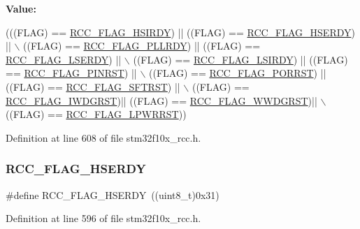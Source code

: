 {\bfseries Value\+:}
\begin{DoxyCode}
(((FLAG) == \hyperlink{group___r_c_c___flag_ga827d986723e7ce652fa733bb8184d216}{RCC\_FLAG\_HSIRDY}) || ((FLAG) == \hyperlink{group___r_c_c___flag_ga173edf47bec93cf269a0e8d0fec9997c}{RCC\_FLAG\_HSERDY}) || \(\backslash\)
                            ((FLAG) == \hyperlink{group___r_c_c___flag_gaf82d8afb18d9df75db1d6c08b9c50046}{RCC\_FLAG\_PLLRDY}) || ((FLAG) == 
      \hyperlink{group___r_c_c___flag_gac9fb963db446c16e46a18908f7fe1927}{RCC\_FLAG\_LSERDY}) || \(\backslash\)
                            ((FLAG) == \hyperlink{group___r_c_c___flag_ga8c5e4992314d347597621bfe7ab10d72}{RCC\_FLAG\_LSIRDY}) || ((FLAG) == 
      \hyperlink{group___r_c_c___flag_gabfc3ab5d4a8a94ec1c9f38794ce37ad6}{RCC\_FLAG\_PINRST}) || \(\backslash\)
                            ((FLAG) == \hyperlink{group___r_c_c___flag_ga39ad309070f416720207eece5da7dc2c}{RCC\_FLAG\_PORRST}) || ((FLAG) == 
      \hyperlink{group___r_c_c___flag_gaf7852615e9b19f0b2dbc8d08c7594b52}{RCC\_FLAG\_SFTRST}) || \(\backslash\)
                            ((FLAG) == \hyperlink{group___r_c_c___flag_gaac46bac8a97cf16635ff7ffc1e6c657f}{RCC\_FLAG\_IWDGRST})|| ((FLAG) == 
      \hyperlink{group___r_c_c___flag_gaa80b60b2d497ccd7b7de1075009999a7}{RCC\_FLAG\_WWDGRST})|| \(\backslash\)
                            ((FLAG) == \hyperlink{group___r_c_c___flag_ga67049531354aed7546971163d02c9920}{RCC\_FLAG\_LPWRRST}))
\end{DoxyCode}


Definition at line 608 of file stm32f10x\+\_\+rcc.\+h.

\mbox{\label{group___r_c_c___flag_ga173edf47bec93cf269a0e8d0fec9997c}} 
\subsubsection{\texorpdfstring{R\+C\+C\+\_\+\+F\+L\+A\+G\+\_\+\+H\+S\+E\+R\+DY}{RCC\_FLAG\_HSERDY}}
{\footnotesize\ttfamily \#define R\+C\+C\+\_\+\+F\+L\+A\+G\+\_\+\+H\+S\+E\+R\+DY~((uint8\+\_\+t)0x31)}



Definition at line 596 of file stm32f10x\+\_\+rcc.\+h.

